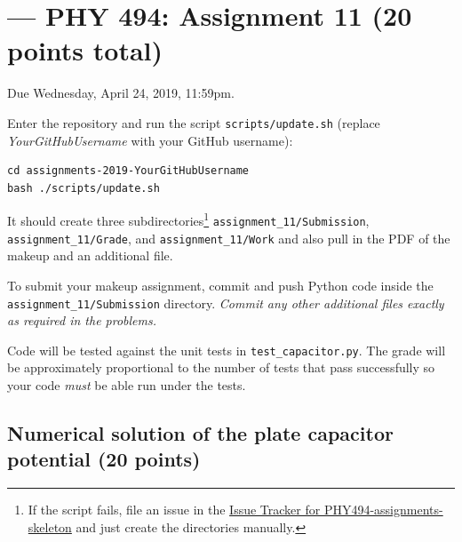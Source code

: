 \documentclass[letterpaper]{scrartcl}
\newcommand{\anumber}{11}
\newcommand{\anum}{\anumber}
\begin{document}

\setcounter{section}{\anumber}
\addtocounter{section}{-1}
\section{ --- PHY 494:  Assignment \anumber{} (20 points total)}

\noindent Due Wednesday, April 24, 2019, 11:59pm.

\noindent
{}

Enter the repository and run the script
\texttt{scripts/update.sh} (replace \emph{YourGitHubUsername} with
your GitHub username):
\begin{verbatim}
cd assignments-2019-YourGitHubUsername
bash ./scripts/update.sh 
\end{verbatim} 
It should create three subdirectories\footnote{If the script fails,
  file an issue in the
  \href{https://github.com/ASU-CompMethodsPhysics-PHY494/PHY494-assignments-skeleton/issues}{Issue
    Tracker for PHY494-assignments-skeleton} and just create the
  directories manually.} \texttt{assignment\_\anum{}/Submission},
\texttt{assignment\_\anum{}/Grade}, and
\texttt{assignment\_\anum{}/Work} and also pull in the PDF of the
makeup and an additional file.

To submit your makeup assignment, commit and push Python code inside
the \texttt{assignment\_\anum{}/Submission} directory. \emph{Commit
  any other additional files exactly as required in the problems.}

Code will be tested against the unit tests in
\texttt{test\_capacitor.py}. The grade will be approximately
proportional to the number of tests that pass successfully so your
code \emph{must} be able run under the tests.



\subsection{Numerical solution of the plate capacitor potential (20 points)}
\label{sec:capacitor}
\end{document}
